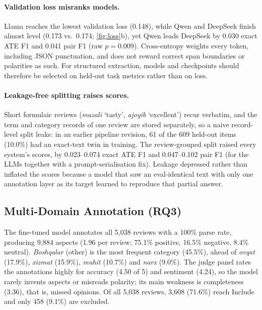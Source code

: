 \documentclass[runningheads]{llncs}
\begin{document}
\paragraph{Validation loss misranks models.} Llama reaches the lowest validation loss (0.148), while Qwen and DeepSeek finish almost level (0.173 vs.\ 0.174; \cref{fig:loss}b), yet Qwen leads DeepSeek by 0.030 exact ATE F1 and 0.041 pair F1 (raw $p{=}0.009$). Cross-entropy weights every token, including JSON punctuation, and does not reward correct span boundaries or polarities as such. For structured extraction, models and checkpoints should therefore be selected on held-out task metrics rather than on loss.

\paragraph{Leakage-free splitting raises scores.} Short formulaic reviews (\textit{mazali} `tasty', \textit{ajoyib} `excellent') recur verbatim, and the term and category records of one review are stored separately, so a naive record-level split leaks: in an earlier pipeline revision, 61 of the 609 held-out items (10.0\%) had an exact-text twin in training. The review-grouped split raised every system's scores, by 0.023--0.074 exact ATE F1 and 0.047--0.102 pair F1 (for the LLMs together with a prompt-serialisation fix). Leakage depressed rather than inflated the scores because a model that saw an eval-identical text with only one annotation layer as its target learned to reproduce that partial answer.

\subsection{Multi-Domain Annotation (RQ3)}
\label{sec:res_domain}

The fine-tuned model annotates all 5,038 reviews with a 100\% parse rate, producing 9,884 aspects (1.96 per review; 75.1\% positive, 16.5\% negative, 8.4\% neutral). \textit{Boshqalar} (other) is the most frequent category (45.5\%), ahead of \textit{ovqat} (17.9\%), \textit{xizmat} (15.9\%), \textit{muhit} (10.7\%) and \textit{narx} (9.0\%). The judge panel rates the annotations highly for accuracy (4.50 of 5) and sentiment (4.24), so the model rarely invents aspects or misreads polarity; its main weakness is completeness (3.36), that is, missed opinions. Of all 5,038 reviews, 3,608 (71.6\%) reach Include and only 458 (9.1\%) are excluded.
\end{document}
